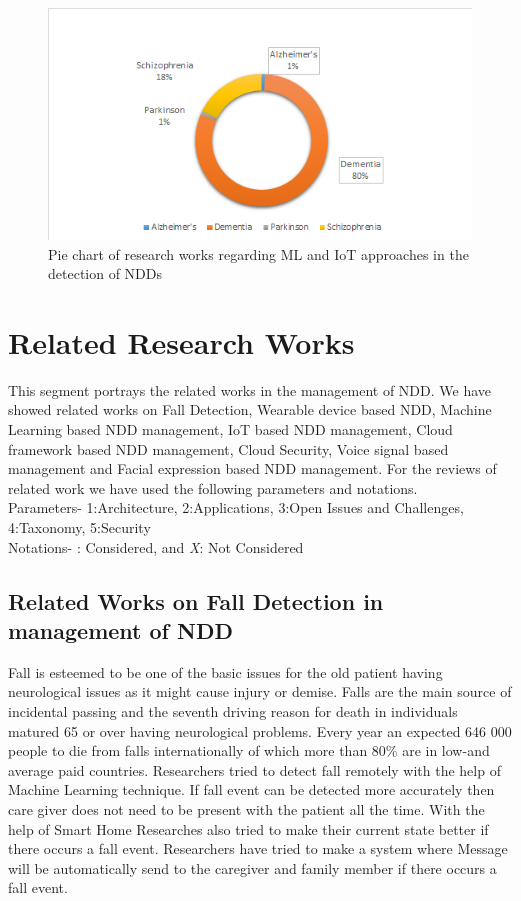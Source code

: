  \begin{figure}[ht]
   \centering
   \includegraphics[width=5.5in]{Chap2/chart4.png}
   \caption{Pie chart of research works regarding ML and IoT approaches in the detection of NDDs}
   \label{fig:chart4}
\end{figure}


\section{Related Research Works}
This segment portrays the related works in the management of NDD. We have showed related works on Fall Detection, Wearable device based NDD, Machine Learning based NDD management, IoT based NDD management, Cloud framework based NDD management, Cloud Security, Voice signal based management and Facial expression based NDD management.  
For the reviews of related work we have used the following parameters and notations.\\
Parameters- 1:Architecture, 2:Applications, 3:Open Issues and Challenges, 4:Taxonomy, 5:Security\\

\vspace{0.15cm}
Notations- \checkmark: Considered, and \textit{\sffamily X}: Not Considered




\subsection{Related Works on Fall Detection in management of NDD}
Fall is esteemed to be one of the basic issues for the old patient having neurological issues as it might cause injury or demise. Falls are the main source of incidental passing and the seventh driving reason for death in individuals matured 65 or over having neurological problems. Every year an expected 646 000 people to die from falls internationally of which more than 80\% are in low-and average paid countries. Researchers tried to detect fall remotely with the help of Machine Learning technique. If fall event can be detected more accurately then care giver does not need to be present with the patient all the time. With the help of Smart Home Researches also tried to make their current state better if there occurs a fall event. Researchers have tried to make a system where Message will be automatically send to the caregiver and family member if there occurs a fall event.

